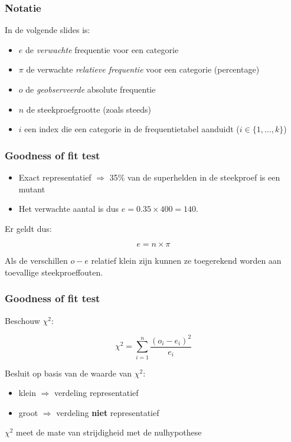 \documentclass[aspectratio=169]{beamer}
\begin{document}
\begin{frame}
\frametitle{Notatie}

In de volgende slides is:

\begin{itemize}
  \item $e$ de \textit{verwachte} frequentie voor een categorie
  \item $\pi$ de verwachte \textit{relatieve frequentie} voor een categorie (percentage)
  \item $o$ de \textit{geobserveerde} absolute frequentie
  \item $n$ de steekproefgrootte (zoals steeds)
  \item $i$ een index die een categorie in de frequentietabel aanduidt ($i \in \{1, \ldots, k\}$)
\end{itemize}
\end{frame}

\begin{frame}
  \frametitle{Goodness of fit test}
\begin{itemize}
  \item Exact representatief $\Rightarrow$ 35\% van de superhelden in de steekproef is een mutant
  \item Het verwachte aantal is dus $e = 0.35 \times 400 = 140$.
\end{itemize}
 Er geldt dus:

\[ e = n \times \pi \]

Als de verschillen $o - e$  relatief klein zijn kunnen ze toegerekend worden aan toevallige steekproeffouten.
\end{frame}

\begin{frame}
  \frametitle{Goodness of fit test}
  Beschouw $\chi^{2}$:

\[ \chi^{2} = \sum_{i=1}^{n} \frac{(o_{i} - e_{i})^{2}}{e_{i}} \]

Besluit op basis van de waarde van $\chi^2$:
\begin{itemize}
  \item klein $\Rightarrow$ verdeling representatief
  \item groot $\Rightarrow$ verdeling \textbf{niet} representatief
\end{itemize}

$\chi^{2}$ meet de mate van strijdigheid met de nulhypothese
\end{frame}
\end{document}
